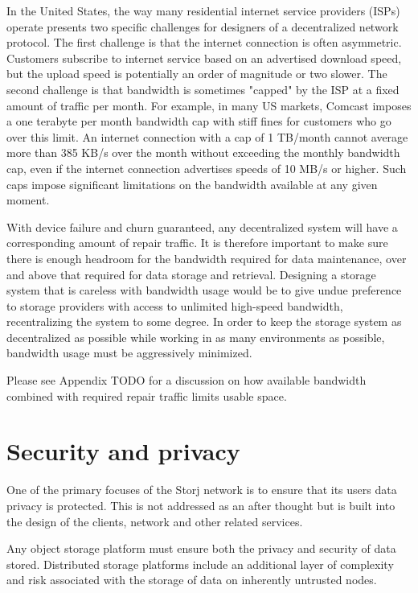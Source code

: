 \documentclass[11pt,fleqn,openany]{book}
\newcommand{\todo}[1]{{\color{red} TODO #1 }}
\begin{document}
In the United States, the way many residential internet service providers (ISPs)
operate presents two specific challenges for designers of a
decentralized network protocol. The first challenge is that the internet
connection is often asymmetric. Customers subscribe to internet service
based on an advertised download speed, but the upload speed is potentially an
order of magnitude or two slower. The second challenge is that bandwidth is
sometimes "capped" by the ISP at a fixed amount of traffic per month.
For example, in many
US markets, Comcast imposes a one terabyte per month bandwidth cap with stiff
fines for customers who go over this limit.
An internet connection with a cap of 1 TB/month cannot average more than
385 KB/s over the month without exceeding the monthly bandwidth cap, even if
the internet connection advertises speeds of 10 MB/s or higher.
Such caps impose
significant limitations on the bandwidth available at any given moment.

With device failure and churn guaranteed, any decentralized system will have a
corresponding amount of repair traffic. It is therefore important to make sure
there is enough headroom for the bandwidth required for data maintenance, over
and above that required for data storage and retrieval. Designing a
storage system that is careless with bandwidth usage would be to give undue
preference to storage providers with access to unlimited high-speed bandwidth,
recentralizing the system to some degree. In order to keep the storage
system as decentralized as possible while working in as many environments
as possible, bandwidth usage must be aggressively minimized.

Please see Appendix \todo{} for a discussion on how available bandwidth
combined with required repair traffic limits usable space.

\section{Security and privacy}
One of the primary focuses of the Storj network is to ensure that its users
data privacy is protected. This is not addressed as an after thought but is
built into the design of the clients, network and other related services.

Any object storage platform must ensure both the privacy and security of data
stored. Distributed storage platforms include an additional layer of
complexity and risk associated with the storage of data on inherently
untrusted nodes.
\end{document}

